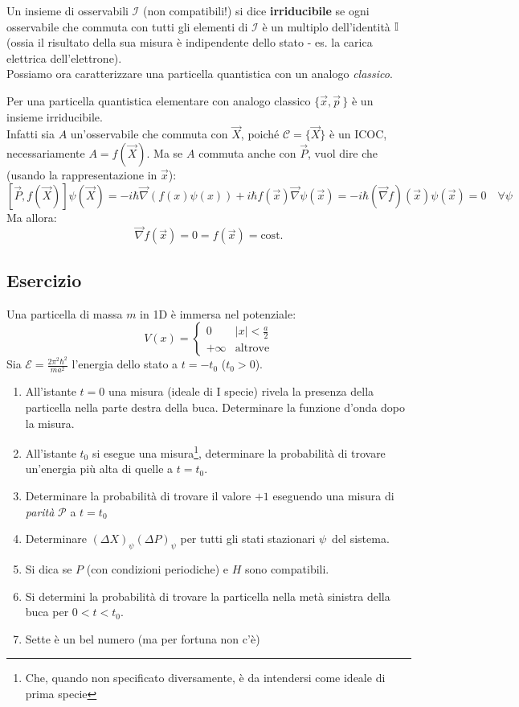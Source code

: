 \documentclass[../../FisicaTeorica.tex]{subfiles}
\begin{document}
\begin{dfn}
Un insieme di osservabili $\mathcal{I}$ (non compatibili!) si dice \textbf{irriducibile} se ogni osservabile che commuta con tutti gli elementi di $\mathcal{I}$ è un multiplo dell'identità $\mathbb{I}$ (ossia il risultato della sua misura è indipendente dello stato - es. la carica elettrica dell'elettrone).\\
Possiamo ora caratterizzare una particella quantistica con un analogo \textit{classico}.
\end{dfn}

\begin{oss}
Per una particella quantistica elementare con analogo classico $\{\vec{x},\vec{p}\,\}$ è un insieme irriducibile.\\
Infatti sia $A$ un'osservabile che commuta con $\vec{X}$, poiché $\mathcal{C}=\{\vec{X}\}$ è un ICOC, necessariamente $A=f(\vec{X})$. Ma se $A$ commuta anche con $\vec{P}$, vuol dire che (usando la rappresentazione in $\vec{x}$):
\[
[\vec{P}, f(\vec{X})]\psi(\vec{X})=-i\hbar \vec{\nabla}(f(x)\psi(x))+i\hbar f(\vec{x})\vec{\nabla}\psi(\vec{x}) = -i\hbar(\vec{\nabla}f)(\vec{x})\psi(\vec{x})=0 \quad \forall \psi
\]
Ma allora:
\[
\vec{\nabla}f(\vec{x})=0=f(\vec{x})=\text{cost.}
\]
\end{oss}

\subsection{Esercizio}
Una particella di massa $m$ in 1D è immersa nel potenziale:
\[
V(x)=\begin{cases}
0 & |x|<\frac{a}{2}\\
+\infty & \text{altrove}
\end{cases}
\]
Sia $\mathcal{E}=\frac{2\pi^2\hbar^2}{ma^2}$ l'energia dello stato a $t=-t_0$ ($t_0>0$).
\begin{enumerate}
\item All'istante $t=0$ una misura (ideale di I specie) rivela la presenza della particella nella parte destra della buca. Determinare la funzione d'onda dopo la misura.
\item All'istante $t_0$ si esegue una misura\footnote{Che, quando non specificato diversamente, è da intendersi come ideale di prima specie}, determinare la probabilità di trovare un'energia più alta di quelle a $t=t_0$.
\item Determinare la probabilità di trovare il valore $+1$ eseguendo una misura di \textit{parità} $\mathcal{P}$ a $t=t_0$
\item Determinare $(\Delta X)_{\psi}(\Delta P)_\psi$ per tutti gli stati stazionari $\psi$\ del sistema.
\item Si dica se $P$ (con condizioni periodiche) e $H$ sono compatibili.
\item Si determini la probabilità di trovare la particella nella metà sinistra della buca per $0<t<t_0$.
\item Sette è un bel numero (ma per fortuna non c'è)
\end{enumerate}
\end{document}
